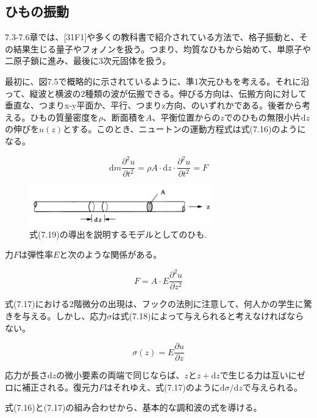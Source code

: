 \documentclass[11pt,a4j,uplatex]{jsarticle}
\begin{document}
\subsection{ひもの振動}
7.3-7.6章では、[31F1]や多くの教科書で紹介されている方法で、格子振動と、その結果生じる量子やフォノンを扱う。つまり、均質なひもから始めて、単原子や二原子鎖に進み、最後に3次元固体を扱う。

最初に、図7.5で概略的に示されているように、準1次元ひもを考える。それに沿って、縦波と横波の2種類の波が伝搬できる。伸びる方向は、伝搬方向に対して垂直な、つまりx-y平面か、平行、つまりz方向、のいずれかである。後者から考える。ひもの質量密度を$\rho$、断面積を$A$、平衡位置からの$z$でのひもの無限小片$\mathrm{d}z$の伸びを$u(z)$とする。このとき、ニュートンの運動方程式は式(7.16)のようになる。

\begin{equation}
  \mathrm{d}m\frac{\partial^2u}{\partial t^2}=\rho A\cdot\mathrm{d}z\cdot\frac{\partial^2u}{\partial t^2}=F\tag{7.16}
\end{equation}

\begin{figure}[tb]
 \centering
 \includegraphics[clip,width=8cm]{7_5.JPG}
 \caption{式(7.19)の導出を説明するモデルとしてのひも.}
 \label{7.5}
\end{figure}

力$F$は弾性率$E$と次のような関係がある。

\begin{equation}
  F=A\cdot E\frac{\partial^2u}{\partial z^2}\tag{7.17}
\end{equation}

式(7.17)における2階微分の出現は、フックの法則に注意して、何人かの学生に驚きを与える。しかし、応力$\sigma$は式(7.18)によって与えられると考えなければならない。

\begin{equation}
  \sigma(z)=E\frac{\partial u}{\partial z}\tag{7.18}
\end{equation}

応力が長さ$\mathrm{d}z$の微小要素の両端で同じならば、$z$と$z+\mathrm{d}z$で生じる力は互いにゼロに補正される。復元力$F$はそれゆえ、式(7.17)のように$\mathrm{d}\sigma/\mathrm{d}z$で与えられる。

式(7.16)と(7.17)の組み合わせから、基本的な調和波の式を導ける。
\end{document}
